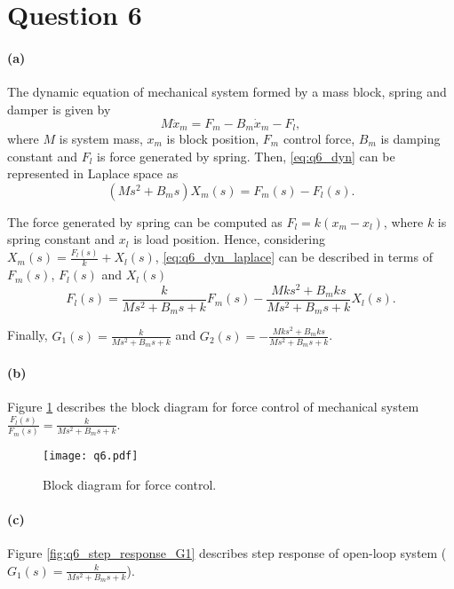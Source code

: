 
\section{Question 6}

\paragraph{(a)} The dynamic equation of mechanical system formed by a mass block, spring and damper is given by
\begin{equation}
	M \ddot{x}_m = F_m - B_m \dot{x}_m - F_l,
	\label{eq:q6_dyn}
\end{equation}
\noindent where $M$ is system mass, $x_m$ is block position, $F_m$ control force, $B_m$ is damping constant and $F_l$ is force generated by spring. Then, \eqref{eq:q6_dyn} can be represented in Laplace space as
\begin{equation}
	(M s^2 + B_m s)X_m (s) = F_m(s) - F_l(s).
	 \label{eq:q6_dyn_laplace}
\end{equation}

The force generated by spring can be computed as $F_l = k (x_m - x_l)$, where $k$ is spring constant and $x_l$ is load position. Hence, considering $X_m(s)=\frac{F_l(s)}{k} + X_l(s)$, \eqref{eq:q6_dyn_laplace} can be described in terms of $F_m(s)$, $F_l(s)$ and $X_l(s) $
\begin{equation}
	F_l(s) = \frac{k}{M s^2 + B_m s + k} F_m(s) - \frac{Mks^2 + B_m k s}{M s^2 + B_m s + k} X_l(s).
\end{equation} 

Finally, $G_1(s)=\frac{k}{M s^2 + B_m s + k}$ and $G_2(s)= - \frac{Mks^2 + B_m k s}{M s^2 + B_m s + k}$.

\paragraph{(b)} Figure \ref{fig:q6_block_diagrama} describes the block diagram for force control of  mechanical system $\frac{F_l(s)}{F_m(s)} = \frac{k}{M s^2 + B_m s + k}$.

\begin{figure}[h!]
	\centering
	\texttt{[image: q6.pdf]}
	\caption{Block diagram for force control.}
	\label{fig:q6_block_diagrama}
\end{figure}

\paragraph{(c)} Figure \ref{fig:q6_step_response_G1} describes step response of open-loop system ( $G_1(s)=\frac{k}{M s^2 + B_m s + k}$).


